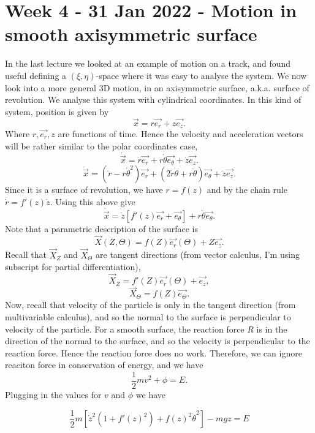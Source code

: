\section{Week 4 - 31 Jan 2022 - Motion in smooth axisymmetric surface}
In the last lecture we looked at an example of motion on a track, and found
useful defining a $(\xi,\eta)$-space where it was easy to analyse the system. We
now look into a more general 3D motion, in an axisymmetric surface, a.k.a.
surface of revolution. We analyse this system with cylindrical coordinates. In
this kind of system, position is given by
\[\vec{x}= r\vec{e_r} + z\vec{e_z}.\]
Where $r,\vec{e_r}, z$ are functions of time. Hence the velocity and
acceleration vectors will be rather similar to the polar coordinates case,
\[\dot{\vec{x}}= \dot{r}\vec{e_r} + r\dot{\theta}\vec{e_{\theta}} +
\dot{z}\vec{e_z}.\]
\[\ddot{\vec{x}}= (\ddot{r}- r\dot{\theta}^2)\vec{e_r} +
(2\dot{r}\dot{\theta}+ r\ddot{\theta})\vec{e_{\theta}} + \ddot{z}\vec{e_z}.\]
Since it is a surface of revolution, we have $r=f(z)$ and by the chain rule
$\dot{r}=f'(z)\dot{z}$. Using this above give
\[\dot{\vec{x}}=\dot{z}\left[ f'(z)\vec{e_r}+\vec{e_{\theta}} \right]
+r\dot{\theta}\vec{e_{\theta}}.\]
Note that a parametric description of the surface is 
\[\vec{X}(Z,\Theta) = f(Z) \vec{e_r}(\Theta) + Z\vec{e_z}.\]
Recall that $\vec{X}_Z$ and $\vec{X}_{\Theta}$ are tangent directions (from
vector calculus, I'm using subscript for partial differentiation),
\[\vec{X}_Z = f'(Z)\vec{e_r}(\Theta) + \vec{e_z},\]
\[\vec{X}_{\Theta} = f(Z)\vec{e_{\Theta}}.\]
Now, recall that velocity of the particle is only in the tangent direction (from
multivariable calculus), and so the normal to the surface is perpendicular to
velocity of the particle. For a smooth surface, the reaction force $R$ is in the
direction of the normal to the surface, and so the velocity is perpendicular to
the reaction force. Hence the reaction force does no work. Therefore, we can
ignore reaciton force in conservation of energy, and we have 
\[\frac{1}{2}mv^2 + \phi = E.\]
Plugging in the values for $v$ and $\phi$ we have 

\begin{equation}
  \frac{1}{2}m\left[ \dot{z}^2 (1+f'(z)^2) + f(z)^2\dot{\theta}^2 \right] -mgz =
  E
  \label{eqn:lec10_axisym_example_conservation}
\end{equation}

